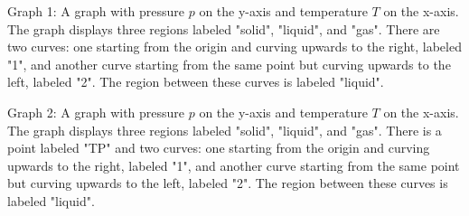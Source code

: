 Graph 1: A graph with pressure \( p \) on the y-axis and temperature \( T \) on the x-axis. The graph displays three regions labeled "solid", "liquid", and "gas". There are two curves: one starting from the origin and curving upwards to the right, labeled "1", and another curve starting from the same point but curving upwards to the left, labeled "2". The region between these curves is labeled "liquid".

Graph 2: A graph with pressure \( p \) on the y-axis and temperature \( T \) on the x-axis. The graph displays three regions labeled "solid", "liquid", and "gas". There is a point labeled "TP" and two curves: one starting from the origin and curving upwards to the right, labeled "1", and another curve starting from the same point but curving upwards to the left, labeled "2". The region between these curves is labeled "liquid".